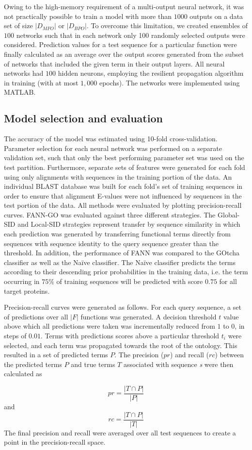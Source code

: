 Owing to the high-memory requirement of a multi-output neural network, it was not practically possible to train a model with more than $1000$ outputs on a data set of size $|D_{MFO}|$ or $|D_{BPO}|$. To overcome this limitation, we created ensembles of $100$ networks such that in each network only 100 randomly selected outputs were considered. Prediction values for a test sequence for a particular function were finally calculated as an average over the output scores generated from the subset of networks that included the given term in their output layers. All neural networks had $100$ hidden neurons, employing the resilient propagation algorithm \citep{Riedmiller1993} in training (with at most $1,000$ epochs). The networks were implemented using MATLAB.

\subsection{Model selection and evaluation}
\label{sec:fanngomodels}

The accuracy of the model was estimated using 10-fold cross-validation. Parameter selection for each neural network was performed on a separate validation set, such that only the best performing parameter set was used on the test partition. Furthermore, separate sets of features were generated for each fold using only alignments with sequences in the training portion of the data. An individual BLAST database was built for each fold's set of training sequences in order to ensure that alignment E-values were not influenced by sequences in the test portion of the data.  All methods were evaluated by plotting precision-recall curves. FANN-GO was evaluated against three different strategies. The Global-SID and Local-SID strategies represent transfer by sequence similarity in which each prediction was generated by transferring functional terms directly from sequences with sequence identity to the query sequence greater than the threshold. In addition, the performance of FANN was compared to the GOtcha classifier \citep{Martin2004} as well as the Na\"ive classifier. The Na\"ive classifier predicts the terms according to their descending prior probabilities in the training data, i.e. the term occurring in $75\%$ of training sequences will be predicted with score $0.75$ for all target proteins.

Precision-recall curves were generated as follows. For each query sequence, a set of predictions over all $|F|$ functions was generated. A decision threshold $t$ value above which all predictions were taken was incrementally reduced from $1$ to $0$, in steps of $0.01$. Terms with predictions scores above a particular threshold $t_{i}$ were selected, and each term was propagated towards the root of the ontology. This resulted in a set of predicted terms $P$. The precision ($pr$) and recall ($rc$) between the predicted terms $P$ and true terms $T$ associated with sequence \emph{s} were then calculated as 

\[
pr=\frac{|T \cap P|}{| P |} 
\]
and 
\[
rc=\frac{| T\cap P |}{|T|}
\]
The final precision and recall were averaged over all test sequences to create a point in the precision-recall space.

